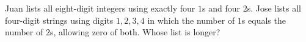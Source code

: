 Juan lists all eight-digit integers using exactly four $1$s and four $2$s. Jose lists all four-digit strings using digits $1,2,3,4$ in which the number of $1$s equals the number of $2$s, allowing zero of both. Whose list is longer?
